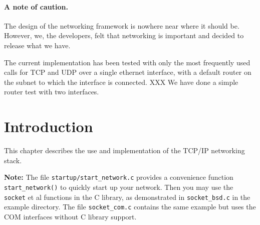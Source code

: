 %
% 
%
\long{}

\label{freebsd-net}

        \paragraph{A note of caution.} The design of the networking
	framework is nowhere near where it should be. However, we, the
	\oskit{} developers, felt that networking is important and
	decided to release what we have. 

	The current implementation has been tested with only the most 
	frequently used 
	calls for TCP and UDP over a single ethernet interface, 
	with a default router on the subnet to which the interface is connected.
	XXX We have done a simple router test with two interfaces.

\section{Introduction}
	This chapter describes the use and implementation of the 
	\freebsd{} TCP/IP networking stack. 

	\textbf{Note:}
	The file \texttt{startup/start_network.c} provides a
	convenience function \texttt{start_network()} to quickly
	start up your network.
	Then you may use the \texttt{socket} et al functions in
	the C library, as demonstrated in 
	\texttt{socket_bsd.c} in the example directory.
	The file \texttt{socket_com.c} contains
	the same example but uses the COM interfaces without
	C library support.
	
